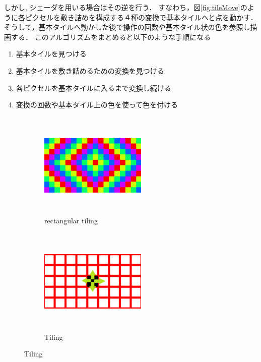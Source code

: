 しかし, シェーダを用いる場合はその逆を行う．
すなわち，図\ref{fig:tileMove}のように各ピクセルを敷き詰めを構成する４種の変換で基本タイルへと点を動かす．
そうして，基本タイルへ動かした後で操作の回数や基本タイル状の色を参照し描画する．
このアルゴリズムをまとめると以下のような手順になる
\begin{enumerate}
 \item 基本タイルを見つける
 \item 基本タイルを敷き詰めるための変換を見つける
 \item 各ピクセルを基本タイルに入るまで変換し続ける
 \item 変換の回数や基本タイル上の色を使って色を付ける
\end{enumerate}

\begin{figure}[h!tbp]
   \begin{subfigure}{0.3\textwidth}
   \begin{center}
    \includegraphics[width=2in, height=2in, keepaspectratio]{../img/tessellation/rectTile.pdf}
    \caption{rectangular tiling}
    \label{fig:rectTile}
   \end{center}
  \end{subfigure}
 \hspace*{\fill}
   \begin{subfigure}{0.3\textwidth}
   \begin{center}
    \includegraphics[width=2in, height=2in, keepaspectratio]{../img/tessellation/tile.pdf}
    \caption{Tiling}
    \label{fig:tile}
   \end{center}

\end{subfigure}
\end{figure}
